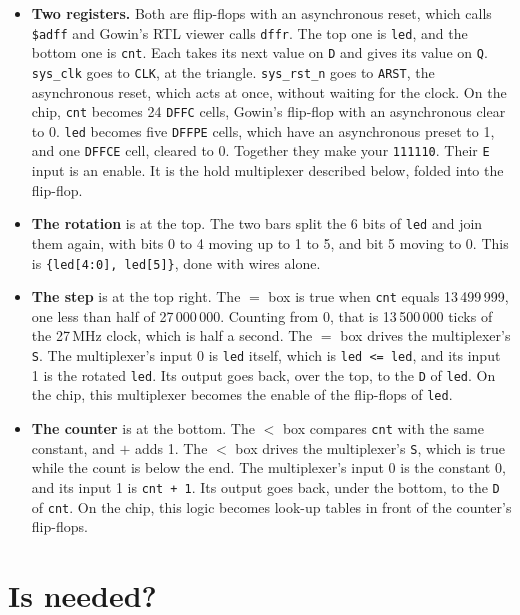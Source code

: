 \documentclass[11pt,a4paper]{article}
\begin{document}
\begin{itemize}
  \item \textbf{Two registers.} Both are flip-flops with an asynchronous reset, which  calls \texttt{\$adff} and Gowin’s RTL viewer calls \texttt{dffr}. The top one is \texttt{led}, and the bottom one is \texttt{cnt}. Each takes its next value on \texttt{D} and gives its value on \texttt{Q}. \texttt{sys\_clk} goes to \texttt{CLK}, at the triangle. \texttt{sys\_rst\_n} goes to \texttt{ARST}, the asynchronous reset, which acts at once, without waiting for the clock. On the chip, \texttt{cnt} becomes 24 \texttt{DFFC} cells, Gowin’s flip-flop with an asynchronous clear to 0. \texttt{led} becomes five \texttt{DFFPE} cells, which have an asynchronous preset to 1, and one \texttt{DFFCE} cell, cleared to 0. Together they make your \texttt{111110}. Their \texttt{E} input is an enable. It is the hold multiplexer described below, folded into the flip-flop.
  \item \textbf{The rotation} is at the top. The two bars split the 6 bits of \texttt{led} and join them again, with bits 0 to 4 moving up to 1 to 5, and bit 5 moving to 0. This is \texttt{\{led[4:0], led[5]\}}, done with wires alone.
  \item \textbf{The step} is at the top right. The $=$ box is true when \texttt{cnt} equals 13\,499\,999, one less than half of 27\,000\,000. Counting from 0, that is 13\,500\,000 ticks of the 27\,MHz clock, which is half a second. The $=$ box drives the multiplexer’s \texttt{S}. The multiplexer’s input 0 is \texttt{led} itself, which is \texttt{led <= led}, and its input 1 is the rotated \texttt{led}. Its output goes back, over the top, to the \texttt{D} of \texttt{led}. On the chip, this multiplexer becomes the enable of the flip-flops of \texttt{led}.
  \item \textbf{The counter} is at the bottom. The $<$ box compares \texttt{cnt} with the same constant, and $+$ adds 1. The $<$ box drives the multiplexer’s \texttt{S}, which is true while the count is below the end. The multiplexer’s input 0 is the constant 0, and its input 1 is \texttt{cnt + 1}. Its output goes back, under the bottom, to the \texttt{D} of \texttt{cnt}. On the chip, this logic becomes look-up tables in front of the counter’s flip-flops.
\end{itemize}

\appendix
\section{Is  needed?}\label{app:done}
\end{document}
